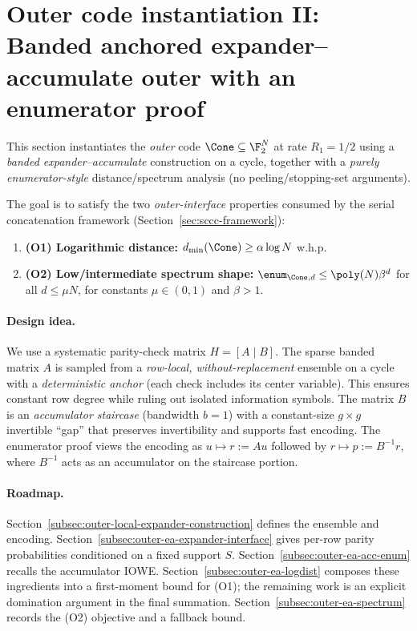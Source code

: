 \section{Outer code instantiation II: Banded anchored expander--accumulate outer with an enumerator proof}
\label{sec:outer-local-expander}

This section instantiates the \emph{outer} code $\Cone\subseteq\F_2^{N}$ at rate $R_1=1/2$ using a
\emph{banded expander--accumulate} construction on a cycle, together with a \emph{purely enumerator-style}
distance/spectrum analysis (no peeling/stopping-set arguments).

The goal is to satisfy the two \emph{outer-interface} properties consumed by the serial concatenation
framework (Section~\ref{sec:sccc-framework}):
\begin{enumerate}
\item \textbf{(O1) Logarithmic distance:} $d_{\min}(\Cone)\ge \alpha\log N$ w.h.p.
\item \textbf{(O2) Low/intermediate spectrum shape:} $\enum_{\Cone,d}\le \poly(N)\beta^{d}$ for all $d\le \mu N$,
      for constants $\mu\in(0,1)$ and $\beta>1$.
\end{enumerate}

\paragraph{Design idea.}
We use a systematic parity-check matrix $H=[A\mid B]$.
The sparse banded matrix $A$ is sampled from a \emph{row-local, without-replacement} ensemble on a cycle with a
\emph{deterministic anchor} (each check includes its center variable). This ensures constant row degree while ruling out
isolated information symbols.
The matrix $B$ is an \emph{accumulator staircase} (bandwidth $b=1$) with a constant-size $g\times g$ invertible ``gap''
that preserves invertibility and supports fast encoding.
The enumerator proof views the encoding as $u\mapsto r:=Au$ followed by $r\mapsto p:=B^{-1}r$, where $B^{-1}$ acts as an
accumulator on the staircase portion.

\paragraph{Roadmap.}
Section~\ref{subsec:outer-local-expander-construction} defines the ensemble and encoding.
Section~\ref{subsec:outer-ea-expander-interface} gives per-row parity probabilities conditioned on a fixed support $S$.
Section~\ref{subsec:outer-ea-acc-enum} recalls the accumulator IOWE.
Section~\ref{subsec:outer-ea-logdist} composes these ingredients into a first-moment bound for (O1); the remaining work is
an explicit domination argument in the final summation.
Section~\ref{subsec:outer-ea-spectrum} records the (O2) objective and a fallback bound.

